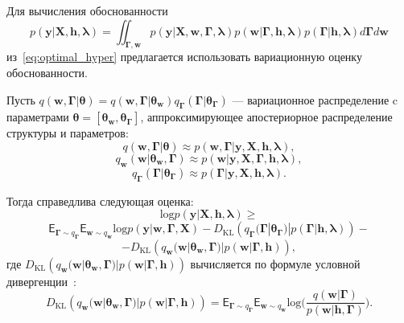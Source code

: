 Для вычисления обоснованности $$p(\mathbf{y}|\mathbf{X}, \mathbf{h}, \boldsymbol{\lambda}) = \iint_{\boldsymbol{\Gamma},\mathbf{w}}p(\mathbf{y}|\mathbf{X}, \mathbf{w}, \boldsymbol{\Gamma},\boldsymbol{\lambda})p(\mathbf{w}|\boldsymbol{\Gamma},\mathbf{h}, \boldsymbol{\lambda})p(\boldsymbol{\Gamma}|\mathbf{h}, \boldsymbol{\lambda})d\boldsymbol{\Gamma}d\mathbf{w}$$ из~\eqref{eq:optimal_hyper} предлагается использовать вариационную оценку обоснованности.

\begin{theorem}
Пусть $q(\mathbf{w},\boldsymbol{\Gamma}|\boldsymbol{\theta})  = q(\mathbf{w},\boldsymbol{\Gamma}|\boldsymbol{\theta}_\mathbf{w})q_{\boldsymbol{\Gamma}}(\boldsymbol{\Gamma}|\boldsymbol{\theta}_{\boldsymbol{\Gamma}})$ --- вариационное распределение c параметрами $\boldsymbol{\theta}= [\boldsymbol{\theta}_\mathbf{w},\boldsymbol{\theta}_{\boldsymbol{\Gamma}} ]$, аппроксимирующее апостериорное распределение структуры и параметров:
\[
    q(\mathbf{w},\boldsymbol{\Gamma}|\boldsymbol{\theta}) \approx p(\mathbf{w},\boldsymbol{\Gamma}|\mathbf{y}, \mathbf{X}, \mathbf{h}, \boldsymbol{\lambda}),
\]
\[
    q_{\mathbf{w}}(\mathbf{w}|\boldsymbol{\theta}_\mathbf{w},\boldsymbol{\Gamma}) \approx p(\mathbf{w}|\mathbf{y}, \mathbf{X},  \boldsymbol{\Gamma},\mathbf{h}, \boldsymbol{\lambda}),
\]
\[
    q_{\boldsymbol{\Gamma}}(\boldsymbol{\Gamma}|\boldsymbol{\theta}_{\boldsymbol{\Gamma}}) \approx p(\boldsymbol{\Gamma}|\mathbf{y}, \mathbf{X},  \mathbf{h}, \boldsymbol{\lambda}).
\]

Тогда справедлива следующая оценка:
\begin{equation}
\label{eq:full_elbo}
\text{log} p(\mathbf{y}|\mathbf{X}, \mathbf{h}, \boldsymbol{\lambda}) \geq
\end{equation}
\[
 \mathsf{E}_{\boldsymbol{\Gamma} \sim q_{\boldsymbol{\Gamma}}}\mathsf{E}_{\mathbf{w} \sim q_{\mathbf{w}}} \text{log}p(\mathbf{y}|\mathbf{w}, \boldsymbol{\Gamma}, \mathbf{X}) - D_\text{KL}\left(q_{\boldsymbol{\Gamma}}(\boldsymbol{\Gamma}|\boldsymbol{\theta}_{\boldsymbol{\Gamma}})|p(\boldsymbol{\Gamma}|\mathbf{h}, \boldsymbol{\lambda})\right) -
\]
\[
 - D_\text{KL}\left(q_{\mathbf{w}}(\mathbf{w}|\boldsymbol{\theta}_\mathbf{w},\boldsymbol{\Gamma})|p(\mathbf{w}|\boldsymbol{\Gamma}, \mathbf{h})\right),
\]
где $D_\text{KL}\left(q_{\mathbf{w}}(\mathbf{w}|\boldsymbol{\theta}_\mathbf{w},\boldsymbol{\Gamma})|p(\mathbf{w}|\boldsymbol{\Gamma}, \mathbf{h})\right)$ вычисляется по формуле условной дивергенции~\cite{TODO}:
\[
D_\text{KL}\left(q_{\mathbf{w}}(\mathbf{w}|\boldsymbol{\theta}_\mathbf{w},\boldsymbol{\Gamma})|p(\mathbf{w}|\boldsymbol{\Gamma}, \mathbf{h})\right) = \mathsf{E}_{\boldsymbol{\Gamma} \sim q_{\boldsymbol{\Gamma}}} \mathsf{E}_{\mathbf{w} \sim q_{\mathbf{w}}} \text{log}\bigl(\frac{q(\mathbf{w}|\boldsymbol{\Gamma})}{p(\mathbf{w}|\mathbf{h},\boldsymbol{\Gamma})}\bigr).
\]
\end{theorem}


